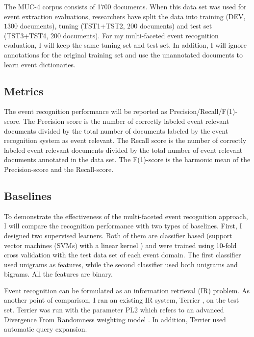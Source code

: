 The MUC-4 corpus consists of 1700 documents.
When this data set was used for event extraction evaluations, 
researchers have split the data into training (DEV, $1300$ documents), 
tuning (TST1+TST2, $200$ documents) and 
test set (TST3+TST4, $200$ documents). 
For my multi-faceted event recognition evaluation, 
I will keep the same tuning set and test set. 
In addition, I will ignore annotations 
for the original training set and use the unannotated documents 
to learn event dictionaries.

\subsection{Metrics}
The event recognition performance will be reported as Precision/Recall/F(1)-score. 
The Precision score is the number of correctly labeled event relevant documents divided by 
the total number of documents labeled by the event recognition system as event relevant. 
The Recall score is the number of correctly labeled event relevant documents divided by 
the total number of event relevant documents annotated in the data set. 
The F(1)-score is the harmonic mean of the Precision-score and the Recall-score. 

\subsection{Baselines}
To demonstrate the effectiveness of the multi-faceted event recognition approach, 
I will compare the recognition performance 
with two types of baselines. 
First, I designed two supervised learners. Both of them are 
classifier based (support vector
machines (SVMs) \cite{joachims99a} with a linear kernel \cite{keerthi05}) 
and were trained using 10-fold cross validation 
with the test data set of each event domain. 
The first classifier used unigrams 
as features, while the second classifier used both unigrams and
bigrams. All the features are binary.  

Event recognition can be formulated as an information retrieval (IR) problem.
As another point of comparison, I ran an
existing IR system, Terrier \cite{Ounis:2007:8380}, on the test set. 
Terrier
was run with the parameter PL2 which refers to an advanced Divergence
From Randomness weighting model \cite{amati02randomness}. In addition, Terrier used
automatic query expansion.



